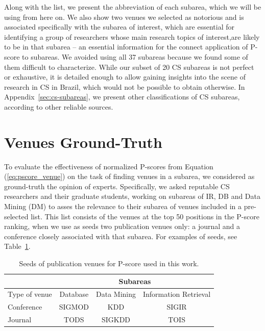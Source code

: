\documentclass[msc]{ppgccufmg}
\begin{document}
Along with the list, we present the abbreviation of each subarea, which we will be using from here on. We also show two venues we selected as notorious and is associated specifically with the subarea of interest, which are essential for identifying a group of researchers whose main research topics of interest,are likely to be in that subarea -- an essential information for the connect application of P-score to subareas. 
%
We avoided using all 37 subareas because we found some of them difficult to characterize. While our subset of 20 CS subareas is not perfect or exhaustive, it is detailed enough to allow gaining insights into the scene of research in CS in Brazil, which would not be possible to obtain otherwise. In Appendix~\ref{sec:cs-subareas}, we present other classifications of CS subareas, according to other reliable sources.



\section{Venues Ground-Truth}\label{sec:venue-ground-truth}

To evaluate the effectiveness of normalized P-scores from Equation (\ref{eq:pscore_venue})  on the task of finding venues in a subarea, we considered as ground-truth the opinion of experts. Specifically, we asked reputable CS researchers and their graduate students, working on subareas of IR, DB and Data Mining (DM) to asses the relevance to their subarea of venues included in a pre-selected list. This list consists of the venues at the top 50 positions in the P-score ranking, when we use as seeds two publication venues only: a journal and a conference closely associated with that subarea. For examples of seeds, see Table~\ref{tab:seeds}.

\begin{table}[htbp]
\centering
\caption{Seeds of publication venues for P-score used in this work.}
\label{tab:seeds}
\begin{tabular}{l|ccc}
\toprule
                                   & \multicolumn{3}{c}{Subareas}                                                            \\ \hline
\multicolumn{1}{c|}{Type of venue} & \multicolumn{1}{c|}{Database} & \multicolumn{1}{c|}{Data Mining} & Information Retrieval \\ \hline
\multicolumn{1}{l|}{Conference}    & \multicolumn{1}{c|}{SIGMOD}   & \multicolumn{1}{c|}{KDD}         & SIGIR                 \\ \hline
\multicolumn{1}{l|}{Journal}       & \multicolumn{1}{c|}{TODS}     & \multicolumn{1}{c|}{SIGKDD}      & TOIS                 \\
\bottomrule
\end{tabular}
\end{table}
\end{document}
